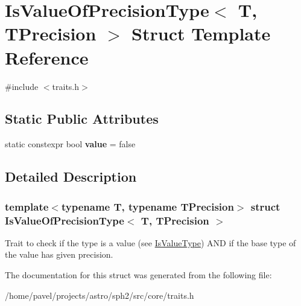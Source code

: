 \hypertarget{structIsValueOfPrecisionType}{}\section{Is\+Value\+Of\+Precision\+Type$<$ T, T\+Precision $>$ Struct Template Reference}
\label{structIsValueOfPrecisionType}


{\ttfamily \#include $<$traits.\+h$>$}

\subsection*{Static Public Attributes}
\begin{DoxyCompactItemize}
\item 
\hypertarget{structIsValueOfPrecisionType_a41933c85d20b23070f255ffd03f0e0a4}{}\label{structIsValueOfPrecisionType_a41933c85d20b23070f255ffd03f0e0a4} 
static constexpr bool {\bfseries value} = false
\end{DoxyCompactItemize}


\subsection{Detailed Description}
\subsubsection*{template$<$typename T, typename T\+Precision$>$\newline
struct Is\+Value\+Of\+Precision\+Type$<$ T, T\+Precision $>$}

Trait to check if the type is a value (see \hyperlink{structIsValueType}{Is\+Value\+Type}) A\+ND if the base type of the value has given precision. 

The documentation for this struct was generated from the following file\+:\begin{DoxyCompactItemize}
\item 
/home/pavel/projects/astro/sph2/src/core/traits.\+h\end{DoxyCompactItemize}
